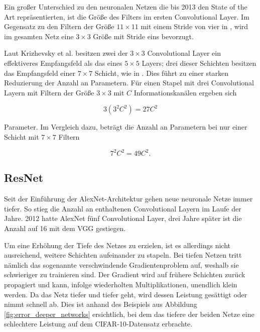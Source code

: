 \mypar Ein großer Unterschied zu den neuronalen Netzen die bis 2013 den State of the Art repräsentierten, ist die Größe des Filters im ersten Convolutional Layer. Im Gegensatz zu den Filtern der Größe $11\times11$ mit einem Stride von vier in \cite{imagenet-class-w-deep-cnns}, wird im gesamten Netz eine $3\times3$ Größe mit Stride eins bevorzugt.

\mypar Laut Krizhevsky et al. \cite{very-deep-cnns-for-large-scale-img-recognition} besitzen zwei der $3\times3$ Convolutional Layer ein effektiveres Empfangsfeld als das eines $5\times5$ Layers; drei dieser Schichten besitzen das Empfangsfeld einer $7\times7$ Schicht, wie in \cite{visualizing-and-understanding-cnns}. Dies führt zu einer starken Reduzierung der Anzahl an Parametern. Für einen Stapel mit drei Convolutional Layern mit Filtern der Größe $3\times3$ mit $C$ Informationskanälen ergeben sich

\begin{equation}\label{eq:vgg1}
3(3^2C^2)=27C^2
\end{equation}

Parameter. Im Vergleich dazu, beträgt die Anzahl an Parametern bei nur einer Schicht mit $7\times7$ Filtern

\begin{equation}\label{eq:vgg2}
7^2C^2=49C^2.
\end{equation}


\subsection{ResNet}
Seit der Einführung der AlexNet-Architektur gehen neue neuronale Netze immer tiefer. So stieg die Anzahl an enthaltenen Convolutional Layern im Laufe der Jahre. 2012 hatte AlexNet \cite{imagenet-class-w-deep-cnns} fünf Convolutional Layer, drei Jahre später ist die Anzahl auf 16 mit dem VGG \cite{very-deep-cnns-for-large-scale-img-recognition} gestiegen.

\mypar Um eine Erhöhung der Tiefe des Netzes zu erzielen, ist es allerdings nicht ausreichend, weitere Schichten aufeinander zu stapeln. Bei tiefen Netzen tritt nämlich das sogenannte verschwindende Gradientenproblem \cite{drn-and-weight-initialization} auf, weshalb sie schwieriger zu trainieren sind. Der Gradient wird auf frühere Schichten zurück propagiert und kann, infolge wiederholten Multiplikationen, unendlich klein werden. Da das Netz tiefer und tiefer geht, wird dessen Leistung gesättigt oder nimmt schnell ab. Dies ist anhand des Beispiels aus Abbildung \ref{fig:error_deeper_networks} ersichtlich, bei dem das tiefere der beiden Netze eine schlechtere Leistung auf dem CIFAR-10-Datensatz erbrachte. 

